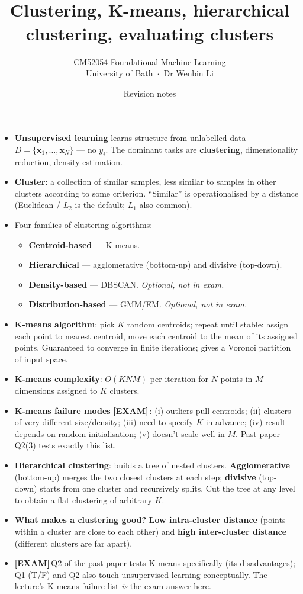 \documentclass[11pt, a4paper]{article}
\title{\vspace{-1cm}{\Huge\bfseries Week 19 — Unsupervised Learning} \\[0.4em]{\large Clustering, K-means, hierarchical clustering, evaluating clusters}}
\author{\large CM52054 Foundational Machine Learning \\[0.2em]\normalsize University of Bath \,$\cdot$\, Dr Wenbin Li}
\date{Revision notes}
\newcommand{\examflag}{\textcolor{tipBd}{\textbf{[EXAM]}}\,}
\begin{document}
\maketitle\thispagestyle{empty}\vspace{1em}

\begin{tldrbox}
\begin{itemize}[leftmargin=*]
  \item \textbf{Unsupervised learning} learns structure from unlabelled data $D = \{\mathbf{x}_1, \ldots, \mathbf{x}_N\}$ — no $y_i$. The dominant tasks are \textbf{clustering}, dimensionality reduction, density estimation.
  \item \textbf{Cluster}: a collection of similar samples, less similar to samples in other clusters according to some criterion. ``Similar'' is operationalised by a distance (Euclidean / $L_2$ is the default; $L_1$ also common).
  \item Four families of clustering algorithms:
  \begin{itemize}
    \item \textbf{Centroid-based} — K-means.
    \item \textbf{Hierarchical} — agglomerative (bottom-up) and divisive (top-down).
    \item \textbf{Density-based} — DBSCAN. \emph{Optional, not in exam.}
    \item \textbf{Distribution-based} — GMM/EM. \emph{Optional, not in exam.}
  \end{itemize}
  \item \textbf{K-means algorithm}: pick $K$ random centroids; repeat until stable: assign each point to nearest centroid, move each centroid to the mean of its assigned points. Guaranteed to converge in finite iterations; gives a Voronoi partition of input space.
  \item \textbf{K-means complexity}: $O(KNM)$ per iteration for $N$ points in $M$ dimensions assigned to $K$ clusters.
  \item \textbf{K-means failure modes} \examflag{}: (i) outliers pull centroids; (ii) clusters of very different size/density; (iii) need to specify $K$ in advance; (iv) result depends on random initialisation; (v) doesn't scale well in $M$. Past paper Q2(3) tests exactly this list.
  \item \textbf{Hierarchical clustering}: builds a tree of nested clusters. \textbf{Agglomerative} (bottom-up) merges the two closest clusters at each step; \textbf{divisive} (top-down) starts from one cluster and recursively splits. Cut the tree at any level to obtain a flat clustering of arbitrary $K$.
  \item \textbf{What makes a clustering good?} \textbf{Low intra-cluster distance} (points within a cluster are close to each other) and \textbf{high inter-cluster distance} (different clusters are far apart).
  \item \examflag{}Q2 of the past paper tests K-means specifically (its disadvantages); Q1 (T/F) and Q2 also touch unsupervised learning conceptually. The lecture's K-means failure list \emph{is} the exam answer here.
\end{itemize}
\end{tldrbox}
\end{document}
